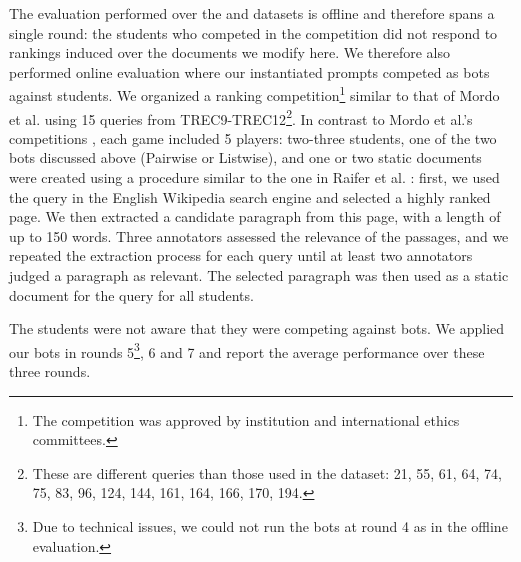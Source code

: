 \omt{
}


 The evaluation performed over the
\firstDataset and \secondDataset datasets is offline and therefore
spans a single round: the students who competed in the competition did
not respond to rankings induced over the documents we modify here. We
therefore also performed online evaluation where our instantiated
prompts competed as bots against students. We organized a ranking
competition\footnote{The competition was approved by institution and international ethics committees.} similar to that of Mordo et al. \cite{Mordo+al:25a} using 15
queries from TREC9-TREC12\footnote{These are different queries than
  those used in the \secondDataset dataset: 21, 55, 61, 64, 74, 75, 83, 96, 124,
  144, 161, 164, 166, 170, 194.}. In contrast to Mordo et al.'s
competitions \cite{Mordo+al:25a}, each game included 5 players: two-three
students, one of the two bots discussed above (Pairwise or
Listwise), and one or two static documents were created using a procedure similar to the one in Raifer et al. \cite{raifer2017information}: first, we used the query in the English Wikipedia search engine and selected a highly ranked page. We then extracted a candidate paragraph from this page, with a length of up to 150 words. Three annotators assessed the relevance of the passages, and we repeated the extraction process for each query until at least two annotators judged a paragraph as relevant. The selected paragraph was then used as a static document for the query for all students.

The students were not aware that they were competing
against bots. We applied our bots in rounds 5\footnote{Due to
  technical issues, we could not run the bots at round 4 as in the offline evaluation.}, 6 and 7 and report the
average performance over these three rounds.

